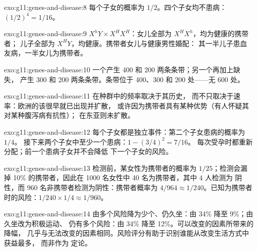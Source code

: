 \begin{solution}{exo:g11:genes-and-disease:8}
每个子女的概率为 $1/2$。四个子女均不患病：$(1/2)^4 = 1/16$。
\end{solution}

\begin{solution}{exo:g11:genes-and-disease:9}
$X^hY \times X^HX^H$：女儿全部为 $X^HX^h$，均为健康的携带者；
儿子全部为 $X^HY$，均健康。携带者女儿与健康男性婚配：
其一半儿子患血友病，一半女儿为携带者。
\end{solution}

\begin{solution}{exo:g11:genes-and-disease:10}
一个产生 400 和 200 两条条带；另一个再加上缺失，
产生 300 和 200 两条条带。条带位于 400、300 和 200 处——无 600 处。
\end{solution}

\begin{solution}{exo:g11:genes-and-disease:11}
在种群中的频率取决于其历史，
而不只取决于速率：欧洲的该很早就已出现并扩散，
或许因为携带者具有某种优势（有人怀疑其对某种腹泻病有抗性）；
在东亚则未扩散。
\end{solution}

\begin{solution}{exo:g11:genes-and-disease:12}
每个子女都是独立事件：第二个子女患病的概率为 $1/4$。
接下来两个子女中至少一个患病：$1 - (3/4)^2 = 7/16$。
每次受孕时都重新分配；前一个患病子女并不会降低
下一个子女的风险。
\end{solution}

\begin{solution}{exo:g11:genes-and-disease:13}
检测前，某女性为携带者的概率为 $1/25$；检测会漏掉
10\% 的携带者，因此在 1000 名女性中 40 名为携带者，其中 4 人检测为
阴性，而 960 名非携带者检测为阴性：携带者概率为
$4/964 \approx 1/240$。已知为携带者时的风险：$1/240 \times 1/4
\approx 1/960$。
\end{solution}

\begin{solution}{exo:g11:genes-and-disease:14}
由多个风险降为少个、仍久坐：由 34\% 降至 9\%；由久坐改为积极运动、
仍有多个风险：由 34\% 降至 12\%。可以改变的因素所带来的降幅，
几乎与无法改变的因素相同。风险评分有助于识别谁能从改变生活方式中获益最多，
而非作为
定论。
\end{solution}

